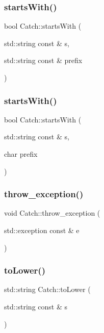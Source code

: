 \mbox{\label{namespace_catch_a695f62327be0676e046291eeaae15110}} 
\subsubsection{startsWith()\hspace{0.1cm}{\footnotesize\ttfamily [1/2]}}
{\footnotesize\ttfamily bool Catch\+::starts\+With (\begin{DoxyParamCaption}\item[{std\+::string const \&}]{s,  }\item[{std\+::string const \&}]{prefix }\end{DoxyParamCaption})}

\mbox{\label{namespace_catch_acad23751846ac23d0f379e34f5adebb1}} 
\subsubsection{startsWith()\hspace{0.1cm}{\footnotesize\ttfamily [2/2]}}
{\footnotesize\ttfamily bool Catch\+::starts\+With (\begin{DoxyParamCaption}\item[{std\+::string const \&}]{s,  }\item[{char}]{prefix }\end{DoxyParamCaption})}

\mbox{\label{namespace_catch_a3cbceeab9252d1b752f66a2826e92548}} 
\subsubsection{throw\_exception()}
{\footnotesize\ttfamily void Catch\+::throw\+\_\+exception (\begin{DoxyParamCaption}\item[{std\+::exception const \&}]{e }\end{DoxyParamCaption})}

\mbox{\label{namespace_catch_ac036a17412d318598ffda8e1fe7a1177}} 
\subsubsection{toLower()}
{\footnotesize\ttfamily std\+::string Catch\+::to\+Lower (\begin{DoxyParamCaption}\item[{std\+::string const \&}]{s }\end{DoxyParamCaption})}

